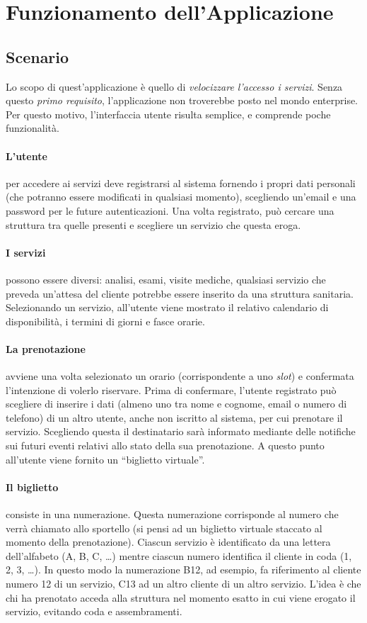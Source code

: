 \section{Funzionamento dell'Applicazione}

\subsection{Scenario}
Lo scopo di quest'applicazione è quello di \textit{velocizzare l'accesso i servizi}. Senza questo \textit{primo requisito}, l'applicazione non troverebbe posto nel mondo enterprise. Per questo motivo, l'interfaccia utente risulta semplice, e comprende poche funzionalità. 
\paragraph{L'utente} per accedere ai servizi deve registrarsi al sistema fornendo i propri dati personali (che potranno essere modificati in qualsiasi momento), scegliendo un'email e una password per le future autenticazioni. Una volta registrato, può cercare una struttura tra quelle presenti e scegliere un servizio che questa eroga. 
\paragraph{I servizi} possono essere diversi: analisi, esami, visite mediche, qualsiasi servizio che preveda un'attesa del cliente potrebbe essere inserito da una struttura sanitaria. Selezionando un servizio, all'utente viene mostrato il relativo calendario di disponibilità, i termini di giorni e fasce orarie. 
\paragraph{La prenotazione} avviene una volta selezionato un orario (corrispondente a uno \emph{slot}) e confermata l'intenzione di volerlo riservare. Prima di confermare, l'utente registrato può scegliere di inserire i dati (almeno uno tra nome e cognome, email o numero di telefono) di un altro utente, anche non iscritto al sistema, per cui prenotare il servizio. Scegliendo questa il destinatario sarà informato mediante delle notifiche sui futuri eventi relativi allo stato della sua prenotazione. A questo punto all'utente viene fornito un ``biglietto virtuale''.
\paragraph{Il biglietto} consiste in una numerazione. Questa numerazione corrisponde al numero che verrà chiamato allo sportello (si pensi ad un biglietto virtuale staccato al momento della prenotazione). Ciascun servizio è identificato da una lettera dell’alfabeto (A, B, C, \dots) mentre ciascun numero identifica il cliente in coda (1, 2, 3, \dots). In questo modo la numerazione B12, ad esempio, fa riferimento al cliente numero 12 di un servizio, C13 ad un altro cliente di un altro servizio. L’idea è che chi ha prenotato acceda alla struttura nel momento esatto in cui viene erogato il servizio, evitando coda e assembramenti.

